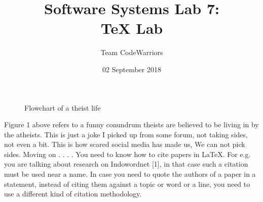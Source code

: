 \documentclass[15pt,a4paper]{article}
\begin{document}
\title{\textbf{Software Systems Lab 7:\\
TeX Lab\\}}
\author{Team CodeWarriors}
\date{02 September 2018}
\begin{titlepage}
\maketitle
{}
\end{titlepage}

\newpage

\begin{figure}
\centering
{}
\caption{Flowchart of a theist life}
\end{figure}



\par
\vspace{5mm}
Figure 1 above refers to a funny conundrum theists are believed to be
living in by the atheists. This is just a joke I picked up from some forum,
not taking sides, not even a bit. This is how scared social media has made
us, We can not pick sides. Moving on . . . . You need to know how to cite
papers in \LaTeX. For e.g. you are talking about research on Indowordnet
[1], in that case such a citation must be used near a name.  In case you
need to quote the authors of a paper in a statement, instead of citing them
against a topic or word or a line, you need to use a different kind of citation
methodology.

\newpage
\end{document}
